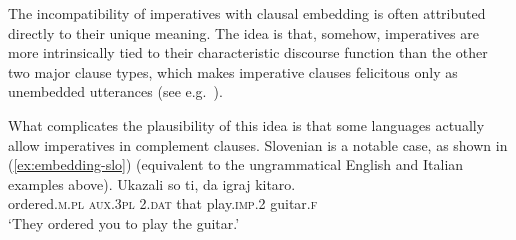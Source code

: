 \documentclass[output=paper,colorlinks,citecolor=brown]{langscibook}
\begin{document}
\z

\z

\noindent The incompatibility of imperatives with clausal embedding is often attributed directly to their unique meaning. The idea is that, somehow, imperatives are more intrinsically tied to their characteristic discourse function than the other two major clause types, which makes imperative clauses felicitous only as unembedded utterances (see e.g.\ \cite{Sadock.Zwicky1985,han98,han00}).

What complicates the plausibility of this idea is that some languages actually allow imperatives in complement clauses. Slovenian is a notable case, as shown in (\ref{ex:embedding-slo}) (equivalent to the ungrammatical English and Italian examples above).
\ea\gll Ukazali so ti, da igraj kitaro.\\
           ordered.\textsc{m.pl} \textsc{aux.3pl} \textsc{2.dat} that play.\textsc{imp.2} guitar.\textsc{f}\\
        \glt `They ordered you to play the guitar.'\label{ex:embedding-slo}
\z
\end{document}
